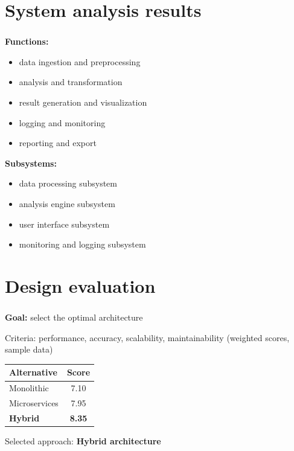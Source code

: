 
\section{System analysis results}

\begin{frame}
  \frametitle{\insertsection}

  \textbf{Functions:}
  \begin{itemize}
    \item data ingestion and preprocessing
    \item analysis and transformation
    \item result generation and visualization
    \item logging and monitoring
    \item reporting and export
  \end{itemize}

  \vspace{\baselineskip}

  \textbf{Subsystems:}
  \begin{itemize}
    \item data processing subsystem
    \item analysis engine subsystem
    \item user interface subsystem
    \item monitoring and logging subsystem
  \end{itemize}
\end{frame}


\section{Design evaluation}

\begin{frame}
  \frametitle{\insertsection}

  \textbf{Goal:} select the optimal architecture

  Criteria: performance, accuracy, scalability, maintainability
  (weighted scores, sample data)

  \vspace{\baselineskip}

  \begin{tabular}{l S[table-format=1.2]}
    \toprule
    Alternative          & {Score} \\
    \midrule
    Monolithic           & 7.10             \\
    Microservices        & 7.95             \\
    \textbf{Hybrid}      & \bfseries 8.35   \\
    \bottomrule
  \end{tabular}

  \vspace{\baselineskip}

  Selected approach: \textbf{Hybrid architecture}
\end{frame}

